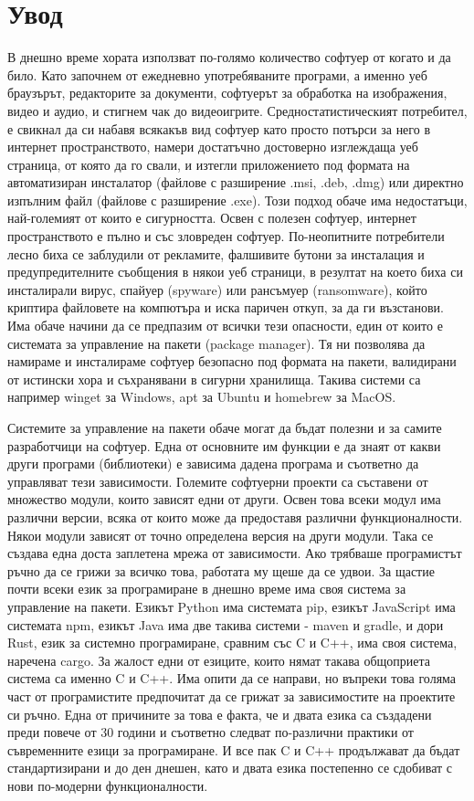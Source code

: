 \chapter*{Увод}

В днешно време хората използват по-голямо количество софтуер от когато и да
било. Като започнем от ежедневно употребяваните програми, а именно уеб
браузърът, редакторите за документи, софтуерът за обработка на изображения,
видео и аудио, и стигнем чак до видеоигрите. Средностатистическият потребител,
е свикнал да си набавя всякакъв вид софтуер като просто потърси за него в
интернет пространството, намери достатъчно достоверно изглеждаща уеб страница,
от която да го свали, и изтегли приложението под формата на автоматизиран
инсталатор (файлове с разширение .msi, .deb, .dmg) или директно изпълним файл
(файлове с разширение .exe). Този подход обаче има недостатъци, най-големият от
които е сигурността. Освен с полезен софтуер, интернет пространството е пълно и
със зловреден софтуер. По-неопитните потребители лесно биха се заблудили от
рекламите, фалшивите бутони за инсталация и предупредителните съобщения в някои
уеб страници, в резултат на което биха си инсталирали вирус, спайуер (spyware)
или рансъмуер (ransomware), който криптира файловете на компютъра и иска паричен
откуп, за да ги възстанови. Има обаче начини да се предпазим от всички тези
опасности, един от които е системата за управление на пакети (package manager).
Тя ни позволява да намираме и инсталираме софтуер безопасно под формата на
пакети, валидирани от истински хора и съхранявани в сигурни хранилища. Такива
системи са например winget за Windows, apt за Ubuntu и homebrew за MacOS.

Системите за управление на пакети обаче могат да бъдат полезни и за самите
разработчици на софтуер. Една от основните им функции е да знаят от какви други
програми (библиотеки) е зависима дадена програма и съответно да управляват тези
зависимости. Големите софтуерни проекти са съставени от множество модули, които
зависят едни от други. Освен това всеки модул има различни версии, всяка от
които може да предоставя различни функционалности. Някои модули зависят от точно
определена версия на други модули. Така се създава една доста заплетена мрежа от
зависимости. Ако трябваше програмистът ръчно да се грижи за всичко това,
работата му щеше да се удвои. За щастие почти всеки език за програмиране в
днешно време има своя система за управление на пакети. Езикът Python има
системата pip, езикът JavaScript има системата npm, езикът Java има две такива
системи - maven и gradle, и дори Rust, език за системно програмиране, сравним
със C и C++, има своя система, наречена cargo. За жалост едни от езиците, които
нямат такава общоприета система са именно C и C++. Има опити да се направи, но
въпреки това голяма част от програмистите предпочитат да се грижат за
зависимостите на проектите си ръчно. Една от причините за това е факта, че и
двата езика са създадени преди повече от 30 години и съответно следват
по-различни практики от съвременните езици за програмиране. И все пак C и C++
продължават да бъдат стандартизирани и до ден днешен, като и двата езика
постепенно се сдобиват с нови по-модерни функционалности.

